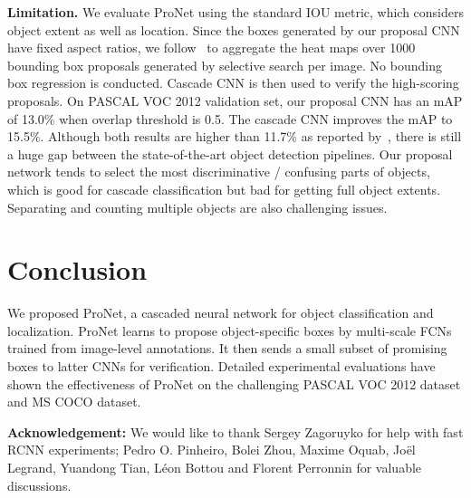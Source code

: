 \documentclass[10pt,twocolumn,letterpaper]{article}
\begin{document}
\textbf{Limitation.} We evaluate ProNet using the standard IOU metric, which considers object extent as well as location. Since the boxes generated by our proposal CNN have fixed aspect ratios, we follow~\cite{Oquab_2015_CVPR} to aggregate the heat maps over 1000 bounding box proposals generated by selective search per image. No bounding box regression is conducted. Cascade CNN is then used to verify the high-scoring proposals. On PASCAL VOC 2012 validation set, our proposal CNN has an mAP of 13.0\% when overlap threshold is 0.5. The cascade CNN improves the mAP to 15.5\%. Although both results are higher than 11.7\% as reported by~\cite{Oquab_2015_CVPR}, there is still a huge gap between the state-of-the-art object detection pipelines. Our proposal network tends to select the most discriminative / confusing parts of objects, which is good for cascade classification but bad for getting full object extents. Separating and counting multiple objects are also challenging issues. 





\section{Conclusion}
We proposed ProNet, a cascaded neural network for object classification and localization. ProNet learns to propose object-specific boxes by multi-scale FCNs trained from image-level annotations. It then sends a small subset of promising boxes to latter CNNs for verification. Detailed experimental evaluations have shown the effectiveness of ProNet on the challenging PASCAL VOC 2012 dataset and MS COCO dataset.

{\small
\quad\newline
\textbf{Acknowledgement:}
We would like to thank Sergey Zagoruyko for help with fast RCNN experiments;
Pedro O. Pinheiro, Bolei Zhou, Maxime Oquab, Jo{\"{e}}l Legrand, Yuandong Tian, L{\'{e}}on Bottou and Florent Perronnin for valuable discussions.
}


{\small


}
\end{document}
